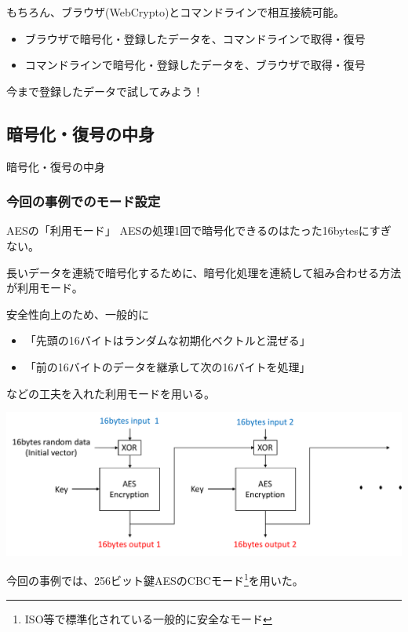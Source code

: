 \documentclass[12pt,dvipdfmx]{beamer}
\begin{document}
\begin{frame}
もちろん、ブラウザ(WebCrypto)とコマンドラインで相互接続可能。
\begin{itemize}
 \item ブラウザで暗号化・登録したデータを、コマンドラインで取得・復号
 \item コマンドラインで暗号化・登録したデータを、ブラウザで取得・復号
\end{itemize}
\begin{center}
今まで登録したデータで試してみよう！ 
\end{center}
\end{frame}

\subsection{暗号化・復号の中身}
\begin{frame}
\centering
{\Large 暗号化・復号の中身}
\end{frame}

\begin{frame}
\frametitle{今回の事例でのモード設定}

\begin{block}{\small AESの「利用モード」}
AESの処理1回で暗号化できるのはたった16bytesにすぎない。

長いデータを連続で暗号化するために、\alert{暗号化処理を連続して組み合わせる方法}が利用モード。
\end{block}
\end{frame}

\begin{frame}
安全性向上のため、一般的に
\begin{itemize}
 \item 「先頭の16バイトはランダムな初期化ベクトルと混ぜる」
 \item 「前の16バイトのデータを継承して次の16バイトを処理」
\end{itemize}
などの工夫を入れた利用モードを用いる。

\begin{center}
\includegraphics[width=0.8\linewidth]{Figs/cbc_mode.pdf}
\end{center}

\vspace{2ex}
今回の事例では、256ビット鍵AESのCBCモード\footnote[frame]{ISO等で標準化されている一般的に安全なモード}を用いた。
\end{frame}
\end{document}
